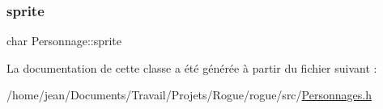 \subsubsection{\texorpdfstring{sprite}{sprite}}
{\footnotesize\ttfamily char Personnage\+::sprite\hspace{0.3cm}{\ttfamily [protected]}}



La documentation de cette classe a été générée à partir du fichier suivant \+:\begin{DoxyCompactItemize}
\item 
/home/jean/\+Documents/\+Travail/\+Projets/\+Rogue/rogue/src/\hyperlink{Personnages_8h}{Personnages.\+h}\end{DoxyCompactItemize}
